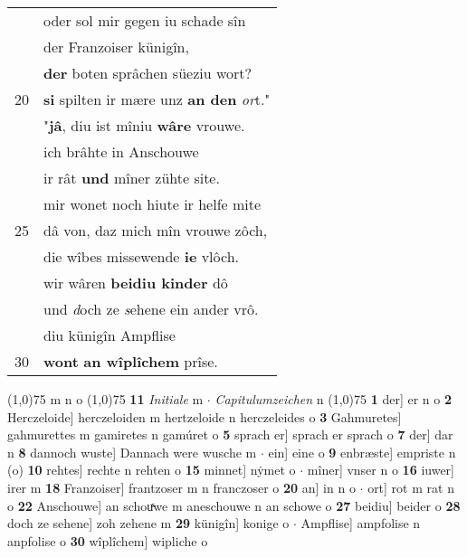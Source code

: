 \documentclass[8pt,a4paper,notitlepage]{article}
\begin{document}
\begin{table}[ht]
\begin{minipage}[t]{0.5\linewidth}
\begin{tabular}{rl}
 & oder sol mir gegen iu schade sîn\\ 
 & der Franzoiser künigîn,\\ 
 & \textbf{der} boten sprâchen süeziu wort?\\ 
20 & \textbf{si} spilten ir mære unz \textbf{an den} \textit{or}t."\\ 
 & "\textbf{jâ}, diu ist mîniu \textbf{wâre} vrouwe.\\ 
 & ich brâhte in Anschouwe\\ 
 & ir rât \textbf{und} mîner zühte site.\\ 
 & mir wonet noch hiute ir helfe mite\\ 
25 & dâ von, daz mich mîn vrouwe zôch,\\ 
 & die wîbes missewende \textbf{ie} vlôch.\\ 
 & wir wâren \textbf{beidiu kinder} dô\\ 
 & und \textit{d}och ze \textit{s}ehene ein ander vrô.\\ 
 & diu künigîn Ampflise\\ 
30 & \textbf{wont} \textbf{an wîplîchem} prîse.\\ 
\end{tabular}
\scriptsize
\line(1,0){75} \newline
m n o \newline
\line(1,0){75} \newline
\textbf{11} \textit{Initiale} m   $\cdot$ \textit{Capitulumzeichen} n  \newline
\line(1,0){75} \newline
\textbf{1} der] er n o \textbf{2} Herczeloide] herczeloiden m hertzeloide n herczeleides o \textbf{3} Gahmuretes] gahmurettes m gamiretes n gamúret o \textbf{5} sprach er] sprach er sprach o \textbf{7} der] dar n \textbf{8} dannoch wuste] Dannach were wusche m  $\cdot$ ein] eine o \textbf{9} enbræste] empriste n (o) \textbf{10} rehtes] rechte n rehten o \textbf{15} minnet] nẏmet o  $\cdot$ mîner] vnser n o \textbf{16} iuwer] irer m \textbf{18} Franzoiser] frantzoser m n franczoser o \textbf{20} an] in n o  $\cdot$ ort] rot m rat n o \textbf{22} Anschouwe] an schouͯwe m aneschouwe n an schowe o \textbf{27} beidiu] beider o \textbf{28} doch ze sehene] zoh zehene m \textbf{29} künigîn] konige o  $\cdot$ Ampflise] ampfolise n anpfolise o \textbf{30} wîplîchem] wipliche o \newline
\end{minipage}
\end{table}
\newpage
\end{document}
